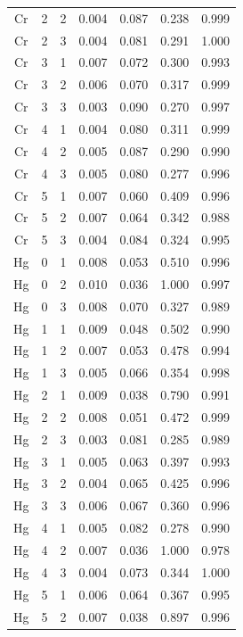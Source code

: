 \documentclass[ms, hidelinks]{uncgdissertationexp3}
\theoremstyle{plain}
\theoremstyle{definition}
\theoremstyle{remark}
\begin{document}
\begin{longtable}{ccccccc}
  Cr & 2 & 2 & 0.004 & 0.087 & 0.238 & 0.999\\
  \rowcolor{gray!6}  Cr & 2 & 3 & 0.004 & 0.081 & 0.291 & 1.000\\
  Cr & 3 & 1 & 0.007 & 0.072 & 0.300 & 0.993\\
  \rowcolor{gray!6}  Cr & 3 & 2 & 0.006 & 0.070 & 0.317 & 0.999\\
  Cr & 3 & 3 & 0.003 & 0.090 & 0.270 & 0.997\\
  \rowcolor{gray!6}  Cr & 4 & 1 & 0.004 & 0.080 & 0.311 & 0.999\\
  Cr & 4 & 2 & 0.005 & 0.087 & 0.290 & 0.990\\
  \rowcolor{gray!6}  Cr & 4 & 3 & 0.005 & 0.080 & 0.277 & 0.996\\
  Cr & 5 & 1 & 0.007 & 0.060 & 0.409 & 0.996\\
  \rowcolor{gray!6}  Cr & 5 & 2 & 0.007 & 0.064 & 0.342 & 0.988\\
  Cr & 5 & 3 & 0.004 & 0.084 & 0.324 & 0.995\\
  \rowcolor{gray!6}  Hg & 0 & 1 & 0.008 & 0.053 & 0.510 & 0.996\\
  Hg & 0 & 2 & 0.010 & 0.036 & 1.000 & 0.997\\
  \rowcolor{gray!6}  Hg & 0 & 3 & 0.008 & 0.070 & 0.327 & 0.989\\
  Hg & 1 & 1 & 0.009 & 0.048 & 0.502 & 0.990\\
  \rowcolor{gray!6}  Hg & 1 & 2 & 0.007 & 0.053 & 0.478 & 0.994\\
  Hg & 1 & 3 & 0.005 & 0.066 & 0.354 & 0.998\\
  \rowcolor{gray!6}  Hg & 2 & 1 & 0.009 & 0.038 & 0.790 & 0.991\\
  Hg & 2 & 2 & 0.008 & 0.051 & 0.472 & 0.999\\
  \rowcolor{gray!6}  Hg & 2 & 3 & 0.003 & 0.081 & 0.285 & 0.989\\
  Hg & 3 & 1 & 0.005 & 0.063 & 0.397 & 0.993\\
  \rowcolor{gray!6}  Hg & 3 & 2 & 0.004 & 0.065 & 0.425 & 0.996\\
  Hg & 3 & 3 & 0.006 & 0.067 & 0.360 & 0.996\\
  \rowcolor{gray!6}  Hg & 4 & 1 & 0.005 & 0.082 & 0.278 & 0.990\\
  Hg & 4 & 2 & 0.007 & 0.036 & 1.000 & 0.978\\
  \rowcolor{gray!6}  Hg & 4 & 3 & 0.004 & 0.073 & 0.344 & 1.000\\
  Hg & 5 & 1 & 0.006 & 0.064 & 0.367 & 0.995\\
  \rowcolor{gray!6}  Hg & 5 & 2 & 0.007 & 0.038 & 0.897 & 0.996\\

\end{longtable}
\end{document}
